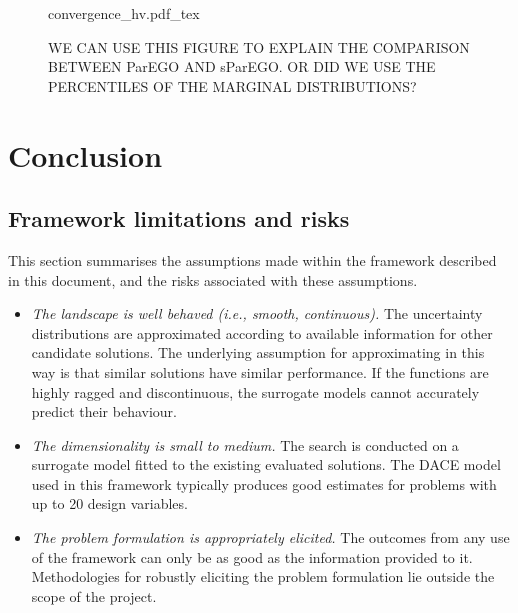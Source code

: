 \documentclass[10pt]{llncs}
\begin{document}
\begin{figure}
\centering
\def\svgwidth{0.45\textwidth}
{convergence_hv.pdf_tex}
\caption{WE CAN USE THIS FIGURE TO EXPLAIN THE COMPARISON BETWEEN ParEGO AND sParEGO. OR DID WE USE THE PERCENTILES OF THE MARGINAL DISTRIBUTIONS?}
\label{fig:convergence}
\end{figure}

\section{Conclusion}
\label{sec:conclusion}

\subsection{Framework limitations and risks}
This section summarises the assumptions made within the framework described in this document, and the risks associated with these assumptions.
\begin{itemize}
	\item \emph{The landscape is well behaved (i.e., smooth, continuous).} The uncertainty distributions are approximated according to available information for other candidate solutions. The underlying assumption for approximating in this way is that similar solutions have similar performance. If the functions are highly ragged and discontinuous, the surrogate models cannot accurately predict their behaviour.
	\item \emph{The dimensionality is small to medium.} The search is conducted on a surrogate model fitted to the existing evaluated solutions. The DACE model used in this framework typically produces good estimates for problems with up to 20 design variables.
	\item \emph{The problem formulation is appropriately elicited.} The outcomes from any use of the framework can only be as good as the information provided to it. Methodologies for robustly eliciting the problem formulation lie outside the scope of the project.
\end{itemize}




\end{document}
